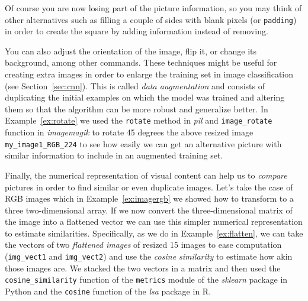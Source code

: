 Of course you are now losing part of the picture information, so you may think of other alternatives such as filling a couple of sides with blank pixels (or \texttt{padding}) in order to create the square by adding information instead of removing.


You can also adjust the orientation of the image, flip it, or change its background, among other commands. These techniques might be useful for creating extra images in order to enlarge the training set in image classification (see Section~\ref{sec:cnn}). This is called \textit{data augmentation} and consists of duplicating the initial examples on which the model was trained and altering them so that the algorithm can be more robust and generalize better. In Example~\ref{ex:rotate} we used the \texttt{rotate} method in \emph{pil} and \texttt{image\_rotate} function in \emph{imagemagik} to rotate 45 degrees the above resized image \texttt{my\_image1\_RGB\_224} to see how easily we can get an alternative picture with similar information to include in an augmented training set.


Finally, the numerical representation of visual content can help us to \textit{compare} pictures in order to find similar or even duplicate images. Let's take the case of RGB images which in Example~\ref{ex:imagergb} we showed how to transform to a three two-dimensional array. If we now convert the three-dimensional matrix of the image into a flattened vector we can use this simpler numerical representation to estimate similarities. Specifically, as we do in Example~\ref{ex:flatten}, we can take the vectors of two \textit{flattened images} of resized 15  images to ease computation (\texttt{img\_vect1} and \texttt{img\_vect2}) and use the \textit{cosine similarity} to estimate how akin those images are. We stacked the two vectors in a matrix and then used the \texttt{cosine\_similarity} function of the \texttt{metrics} module of the  \emph{sklearn} package in Python and the \texttt{cosine} function of the \emph{lsa} package in R.


